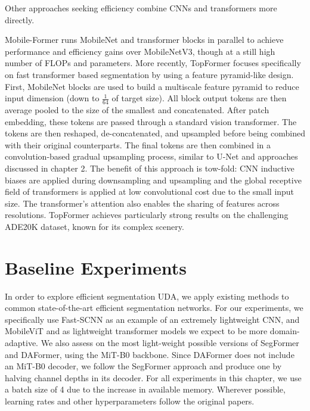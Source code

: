 \documentclass[a4paper,12pt]{report}
\begin{document}
Other approaches seeking efficiency combine CNNs and transformers more directly.

Mobile-Former \cite{chen_mobile-former_2022} runs MobileNet and transformer blocks in parallel to achieve performance and efficiency gains over MobileNetV3, though at a still high number of FLOPs and parameters. More recently, TopFormer \cite{zhang_topformer_2022} focuses specifically on fast transformer based segmentation by using a feature pyramid-like design. First, MobileNet blocks are used to build a multiscale feature pyramid to reduce input dimension (down to $\frac{1}{64}$ of target size). All block output tokens are then average pooled to the size of the smallest and concatenated. After patch embedding, these tokens are passed through a standard vision transformer. The tokens are then reshaped, de-concatenated, and upsampled before being combined with their original counterparts. The final tokens are then combined in a convolution-based gradual upsampling process, similar to U-Net \cite{ronneberger_u-net_2015} and approaches discussed in chapter 2. The benefit of this approach is tow-fold: CNN inductive biases are applied during downsampling and upsampling and the global receptive field of transformers is applied at low convolutional cost due to the small input size. The transformer's attention also enables the sharing of features across resolutions. TopFormer achieves particularly strong results on the challenging ADE20K dataset, known for its complex scenery.



\section{Baseline Experiments}
In order to explore efficient segmentation UDA, we apply existing methods to common state-of-the-art efficient segmentation networks. For our experiments, we specifically use Fast-SCNN \cite{poudel_fast-scnn_2019} as an example of an extremely lightweight CNN, and MobileViT \cite{mehta_mobilevit_2022} and \cite{zhang_topformer_2022} as lightweight transformer models we expect to be more domain-adaptive. We also assess on the most light-weight possible versions of SegFormer and DAFormer, using the MiT-B0 backbone. Since DAFormer does not include an MiT-B0 decoder, we follow the SegFormer approach and produce one by halving channel depths in its decoder. For all experiments in this chapter, we use a batch size of 4 due to the increase in available memory. Wherever possible, learning rates and other hyperparameters follow the original papers.
\end{document}
